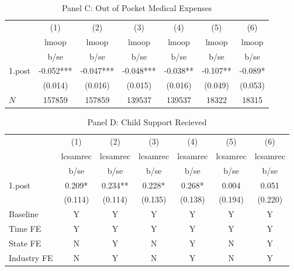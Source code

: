 \begin{table}[htbp]\centering
\def\sym#1{\ifmmode^{#1}\else\(^{#1}\)\fi}
\caption{Panel C: Out of Pocket Medical Expenses}
\begin{tabular}{l*{6}{c}}
\hline\hline
            &\multicolumn{1}{c}{(1)}&\multicolumn{1}{c}{(2)}&\multicolumn{1}{c}{(3)}&\multicolumn{1}{c}{(4)}&\multicolumn{1}{c}{(5)}&\multicolumn{1}{c}{(6)}\\
            &\multicolumn{1}{c}{lmoop}&\multicolumn{1}{c}{lmoop}&\multicolumn{1}{c}{lmoop}&\multicolumn{1}{c}{lmoop}&\multicolumn{1}{c}{lmoop}&\multicolumn{1}{c}{lmoop}\\
            &        b/se   &        b/se   &        b/se   &        b/se   &        b/se   &        b/se   \\
\hline
1.post#1.treat&      -0.052***&      -0.047***&      -0.048***&      -0.038** &      -0.107** &      -0.089*  \\
            &     (0.014)   &     (0.016)   &     (0.015)   &     (0.016)   &     (0.049)   &     (0.053)   \\
\hline
\(N\)       &      157859   &      157859   &      139537   &      139537   &       18322   &       18315   \\
\hline\hline
\end{tabular}
\end{table}
\begin{table}[htbp]\centering
\def\sym#1{\ifmmode^{#1}\else\(^{#1}\)\fi}
\caption{Panel D: Child Support Recieved}
\begin{tabular}{l*{6}{c}}
\hline\hline
            &\multicolumn{1}{c}{(1)}&\multicolumn{1}{c}{(2)}&\multicolumn{1}{c}{(3)}&\multicolumn{1}{c}{(4)}&\multicolumn{1}{c}{(5)}&\multicolumn{1}{c}{(6)}\\
            &\multicolumn{1}{c}{lcsamrec}&\multicolumn{1}{c}{lcsamrec}&\multicolumn{1}{c}{lcsamrec}&\multicolumn{1}{c}{lcsamrec}&\multicolumn{1}{c}{lcsamrec}&\multicolumn{1}{c}{lcsamrec}\\
            &        b/se   &        b/se   &        b/se   &        b/se   &        b/se   &        b/se   \\
\hline
1.post#1.treat&       0.209*  &       0.234** &       0.228*  &       0.268*  &       0.004   &       0.051   \\
            &     (0.114)   &     (0.114)   &     (0.135)   &     (0.138)   &     (0.194)   &     (0.220)   \\
\hline
Baseline    &           Y   &           Y   &           Y   &           Y   &           Y   &           Y   \\
Time FE     &           Y   &           Y   &           Y   &           Y   &           Y   &           Y   \\
State FE    &           N   &           Y   &           N   &           Y   &           N   &           Y   \\
Industry FE &           N   &           Y   &           N   &           Y   &           N   &           Y   \\
\hline\hline
\end{tabular}
\end{table}
